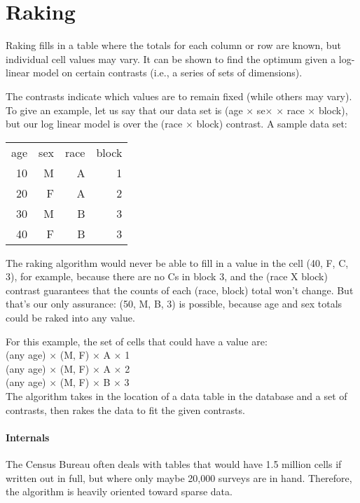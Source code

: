 \documentclass{article}
\begin{document}

\section{Raking}
Raking fills in a table where the totals for each column or row are known, but
individual cell values may vary. It can be shown to find the optimum given a
log-linear model on certain contrasts (i.e., a series of sets of dimensions).

The contrasts indicate which values are to remain fixed (while others may vary).
To give an example, 
let us say that our data set is (age $\times$ se$\times$ $\times$ race $\times$ block), but
our log linear model is over the (race $\times$ block) contrast. A sample data set:

\begin{tabular}{rrrr}
age &sex &race &block\\
10  &M   &A    &1\\
20  &F   &A    &2\\
30  &M   &B    &3\\
40  &F   &B    &3
\end{tabular}

The raking algorithm would never be able to fill in a value in the cell (40, F, C, 3), for example, because
there are no Cs in block 3, and the (race X block) contrast guarantees that the counts of
each (race, block) total won't change. But that's our only assurance: (50, M, B, 3) is
possible, because age and sex totals could be raked into any value.

For this example, the set of cells that could have a value are:\\
(any age) $\times$ (M, F) $\times$ A $\times$ 1\\
(any age) $\times$ (M, F) $\times$ A $\times$ 2\\
(any age) $\times$ (M, F) $\times$ B $\times$ 3\\

The algorithm takes in the location of a data table in the database and a set of
contrasts, then rakes the data to fit the given contrasts.

\paragraph{Internals}
The Census Bureau often deals with tables that would have 1.5 million cells if written
out in full, but where only maybe 20,000 surveys are in hand. Therefore, the algorithm
is heavily oriented toward sparse data.
\end{document}
